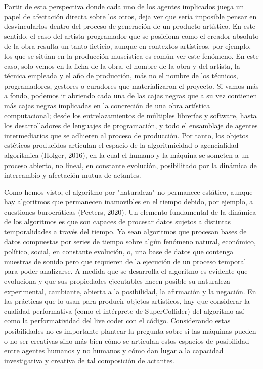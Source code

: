 Partir de esta perspectiva donde cada uno de los agentes implicados juega un papel de afectación directa sobre los otros, deja ver que sería imposible pensar en desvincularlos dentro del proceso de generación de un producto artístico. En este sentido, el caso del artista-programador que se posiciona como el creador absoluto de la obra resulta un tanto ficticio, aunque en contextos artísticos, por ejemplo, los que se sitúan en la producción museística es común ver este fenómeno. En este caso, solo vemos en la ficha de la obra, el nombre de la obra y del artista, la técnica empleada y el año de producción, más no el nombre de los técnicos, programadores, gestores o curadores que materializaron el proyecto. Si vamos más a fondo, podemos ir abriendo cada una de las
cajas negras que a su vez contienen más cajas negras implicadas en la concreción de una obra artística computacional; desde los entrelazamientos de múltiples librerías y software, hasta los desarrolladores de lenguajes de programación, y todo el ensamblaje de agentes intermediarios que se adhieren al proceso de producción. Por tanto, los objetos estéticos producidos articulan el espacio de la algoritmicidad o agencialidad algorítmica (Holger, 2016), en la cual el humano y la máquina se someten a un proceso abierto, no lineal, en constante evolución, posibilitado por la dinámica de intercambio y afectación mutua de actantes.

Como hemos visto, el algoritmo por
"naturaleza" no permanece estático, aunque hay algoritmos que permanecen inamovibles en el tiempo debido, por ejemplo, a cuestiones burocráticas (Peeters, 2020). Un elemento fundamental de la dinámica de los algoritmos es que son capaces de procesar datos sujetos a distintas temporalidades a través del tiempo. Ya sean algoritmos que procesan bases de datos compuestas por series de tiempo sobre algún fenómeno natural, económico, político, social, en constante evolución, o, una base de datos que contenga muestras de sonido pero que requieren de la ejecución de un proceso temporal para poder analizarse. A medida que se desarrolla el algoritmo es evidente que evoluciona y que sus propiedades ejecutables hacen posible su naturaleza experimental, cambiante, abierta a la posibilidad, la afirmación y la negación. En las prácticas que lo usan para producir objetos artísticos, hay que considerar la cualidad performativa (como el intérprete de SuperCollider) del algoritmo así como la performatividad del live coder con el código. Considerando estas posibilidades no es importante plantear la pregunta sobre si las máquinas pueden o no ser creativas sino más bien cómo se articulan estos espacios de posibilidad entre agentes humanos y no humanos y cómo dan lugar a la capacidad investigativa y creativa de tal composición de actantes.

